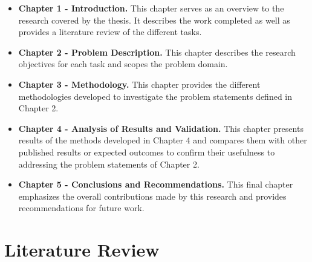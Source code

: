 \begin{itemize}

\item \textbf{Chapter 1 - Introduction.} This chapter serves as an overview to the research covered by the thesis. It describes the work completed as well as provides a literature review of the different tasks.

\item \textbf{Chapter 2 - Problem Description.} This chapter describes the research objectives for each task and scopes the problem domain.

\item \textbf{Chapter 3 - Methodology.} This chapter provides the different methodologies developed to investigate the problem statements defined in Chapter 2.

\item \textbf{Chapter 4 - Analysis of Results and Validation.} This chapter presents results of the methods developed in Chapter 4 and compares them with other published results or expected outcomes to confirm their usefulness to addressing the problem statements of Chapter 2.

\item \textbf{Chapter 5 - Conclusions and Recommendations.} This final chapter emphasizes the overall contributions made by this research and provides recommendations for future work.

\end{itemize}
\section{Literature Review}

